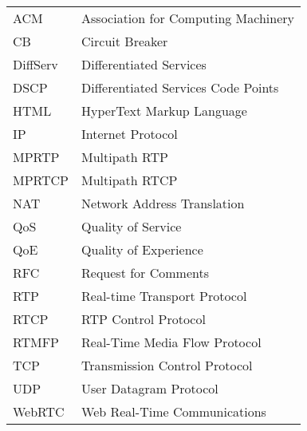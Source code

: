 \begin{longtable}{ll}
ACM		& Association for Computing Machinery \\
CB		& Circuit Breaker \\
DiffServ	& Differentiated Services \\
DSCP 	& Differentiated Services Code Points \\
HTML	& HyperText Markup Language \\
IP		& Internet Protocol \\
MPRTP 	& Multipath RTP \\
MPRTCP 	& Multipath RTCP \\
NAT		& Network Address Translation \\
QoS		& Quality of Service \\
QoE		& Quality of Experience \\
RFC 	& Request for Comments \\
RTP 	& Real-time Transport Protocol \\
RTCP 	& RTP Control Protocol \\
RTMFP	& Real-Time Media Flow Protocol \\
TCP		& Transmission Control Protocol \\
UDP		& User Datagram Protocol \\
WebRTC 	& Web Real-Time Communications \\
\end{longtable}
